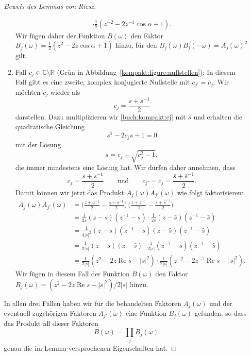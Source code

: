 \begin{proof}[Beweis des Lemmas von Riesz]
\begin{enumerate}
\begin{align*}
\cdot
\frac{1}{2}
(z^{-2}-2z^{-1}\cos\alpha +1).
\end{align*}
Wir fügen daher der Funktion $B(\omega)$ den Faktor
$B_j(\omega)=\frac12(z^2-2z\cos\alpha +1)$ hinzu, für
den 
$B_j(\omega)B_j(-\omega)=A_j(\omega)^2$ gilt.
\item
Fall $c_j\in\mathbb C\setminus\mathbb R$ ({\color{darkgreen}Grün} in
Abbildung~\ref{kompakt:figure:nullstellen}):
In diesem Fall gibt es eine zweite, komplex konjugierte Nullstelle mit
$c_{j'}=\bar{c}_j$.
Wir möchten $c_j$ wieder als
\begin{equation}
c_j
=
\frac{s+s^{-1}}2
\label{buch:kompakt:cj}
\end{equation}
darstellen.
Dazu multiplizieren wir \eqref{buch:kompakt:cj} mit $s$ und erhalten die
quadratische Gleichung
\[
s^2-2c_j s+1=0
\]
mit der Lösung
\[
s=c_j\pm\sqrt{c_j^2-1},
\]
die immer mindestens eine Lösung hat.
Wir dürfen daher annehmen, dass
\[
c_j = \frac{s+s^{-1}}2
\qquad\text{und}\qquad
c_{j'} = \bar{c}_j = \frac{\bar{s}+\bar{s}^{-1}}2.
\]
Damit können wir jetzt das Produkt $A_j(\omega)A_{j'}(\omega)$ 
wie folgt faktorisieren:
\begin{align*}
A_j(\omega)A_{j'}(\omega)
&=
\biggl(
\frac{z+z^{-1}}2 - \frac{s+s^{-1}}2
\biggr)
\,
\biggl(
\frac{z+z^{-1}}2 - \frac{\bar{s}+\bar{s}^{-1}}2
\biggr)
\\
&=
\frac{1}{2s}
(z-s)(z^{-1}-s)
\cdot
\frac{1}{2\bar{s}}
(z-\bar{s})(z^{-1}-\bar{s})
\\
&=
\frac{1}{4|s|^2}(z-s)(z^{-1}-s)(z-\bar{s})(z^{-1}-\bar{s})
\\
&=
\frac1{2|s|}
(z-s)
(z-\bar{s})
\cdot
\frac1{2|s|}
(z^{-1}-s)
(z^{-1}-\bar{s})
\\
&=
\frac1{2|s|}(z^2-2z\operatorname{Re}s -|s|^2)
\cdot
\frac1{2|s|}(z^{-2}-2z^{-1}\operatorname{Re}s -|s|^2).
\end{align*}
Wir fügen in diesem Fall der Funktion $B(\omega)$ den Faktor
$B_j(\omega)=(z^2-2z\operatorname{Re}s-|s|^2)/2|s|$ hinzu.
\end{enumerate}
In allen drei Fällen haben wir für die behandelten Faktoren $A_j(\omega)$
und der eventuell zugehörigen Faktoren $A_{j'}(\omega)$ eine Funktion
$B_j(\omega)$ gefunden, so dass das Produkt all dieser Faktoren
\[
B(\omega)
=
\prod_j B_j(\omega)
\]
genau die im Lemma versprochenen Eigenschaften hat.
\end{proof}


